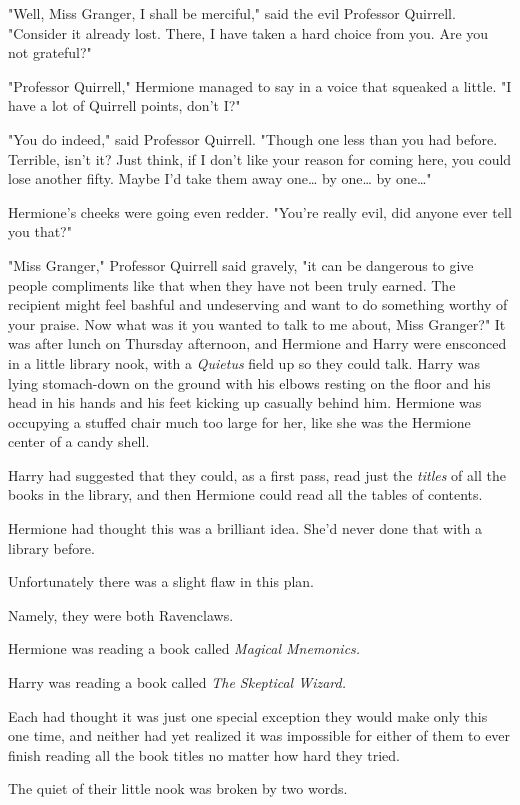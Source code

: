 "Well, Miss Granger, I shall be merciful," said the evil Professor Quirrell. 
"Consider it already lost. There, I have taken a hard choice from you. Are you 
not grateful?"

"Professor Quirrell," Hermione managed to say in a voice that squeaked a 
little. "I have a lot of Quirrell points, don't I?"

"You do indeed," said Professor Quirrell. "Though one less than you had before. 
Terrible, isn't it? Just think, if I don't like your reason for coming here, 
you could lose another fifty. Maybe I'd take them away one{\ldots} by 
one{\ldots} by one{\ldots}"

Hermione's cheeks were going even redder. "You're really evil, did anyone ever 
tell you that?"

"Miss Granger," Professor Quirrell said gravely, "it can be dangerous to give 
people compliments like that when they have not been truly earned. The 
recipient might feel bashful and undeserving and want to do something worthy of 
your praise. Now what was it you wanted to talk to me about, Miss Granger?"
\sbreak
It was after lunch on Thursday afternoon, and Hermione and Harry were ensconced 
in a little library nook, with a \emph{Quietus} field up so they could talk. 
Harry was lying stomach-down on the ground with his elbows resting on the floor 
and his head in his hands and his feet kicking up casually behind him. Hermione 
was occupying a stuffed chair much too large for her, like she was the Hermione 
center of a candy shell.

Harry had suggested that they could, as a first pass, read just the 
\emph{titles} of all the books in the library, and then Hermione could read all 
the tables of contents.

Hermione had thought this was a brilliant idea. She'd never done that with a 
library before.

Unfortunately there was a slight flaw in this plan.

Namely, they were both Ravenclaws.

Hermione was reading a book called \emph{Magical Mnemonics.}

Harry was reading a book called \emph{The Skeptical Wizard.}

Each had thought it was just one special exception they would make only this 
one time, and neither had yet realized it was impossible for either of them to 
ever finish reading all the book titles no matter how hard they tried.

The quiet of their little nook was broken by two words.

